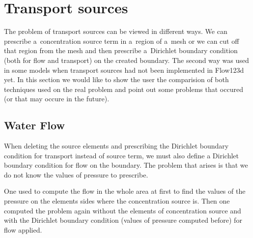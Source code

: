 \pagebreak

\clearpage



\clearpage

\section{Transport sources}
\label{sec:compare_sources}
The problem of transport sources can be viewed in different ways. We can prescribe a~concentration source term in a~region of a~mesh 
or we can cut off that region from the mesh and then prescribe a~Dirichlet boundary condition (both for flow and transport)
on the created boundary. The second way was used in some models when transport sources had not been implemented in Flow123d yet.
In this section we would like to show the user the comparision of both techniques used on the real problem and point out some problems
that occured (or that may occure in the future).

\subsection{Water Flow}
When deleting the source elements and prescribing the Dirichlet boundary condition for transport instead 
of source term, we must also define a Dirichlet boundary condition for flow on the boundary. The problem that arises is that we 
do not know the values of pressure to prescribe. 

One used to compute the flow in the whole area at first to find the values of the pressure on the elements sides 
where the concentration source is. Then one computed the problem again without the elements of concentration source and with the 
Dirichlet boundary condition (values of pressure computed before) for flow applied. 

